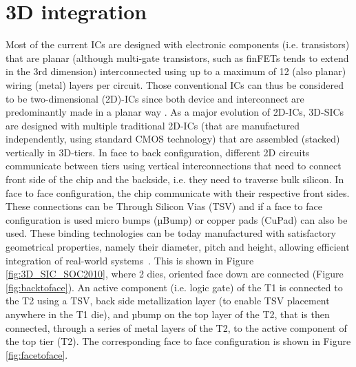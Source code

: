 %
%
%
%

\section{3D integration}

Most of the current ICs are designed with electronic components (i.e. transistors) that are planar (although multi-gate transistors, such as finFETs tends to extend in the 3rd dimension) interconnected using up to a maximum of 12 (also planar) wiring (metal) layers per circuit. Those conventional ICs can thus be considered to be two-dimensional (2D)-ICs since both device and interconnect are predominantly made in a planar way \cite{1393404,fujitsu08}. As a major evolution of 2D-ICs, 3D-SICs are designed with multiple traditional 2D-ICs (that are manufactured independently, using standard CMOS technology) that are assembled (stacked) vertically in 3D-tiers. In face to back configuration, different 2D circuits communicate between tiers using vertical interconnections that need to connect front side of the chip and the backside, i.e. they need to traverse bulk silicon. In face to face configuration, the chip communicate with their respective front sides. These connections can be Through Silicon Vias (TSV) and if a face to face configuration is used micro bumps (µBump) or copper pads (CuPad) can also be used. These binding technologies can be today manufactured with satisfactory geometrical properties, namely their diameter, pitch and height, allowing efficient integration of real-world systems~\cite{1705326,5746413}. This is shown in Figure \ref{fig:3D_SIC_SOC2010}, where 2 dies, oriented face down are connected (Figure \ref{fig:backtoface}). An active component (i.e. logic gate) of the T1 is connected to the T2 using a TSV, back side metallization layer (to enable TSV placement anywhere in the T1 die), and µbump on the top layer of the T2, that is then connected, through a series of metal layers of the T2, to the active component of the top tier (T2). The corresponding face to face configuration is shown in Figure \ref{fig:facetoface}.


